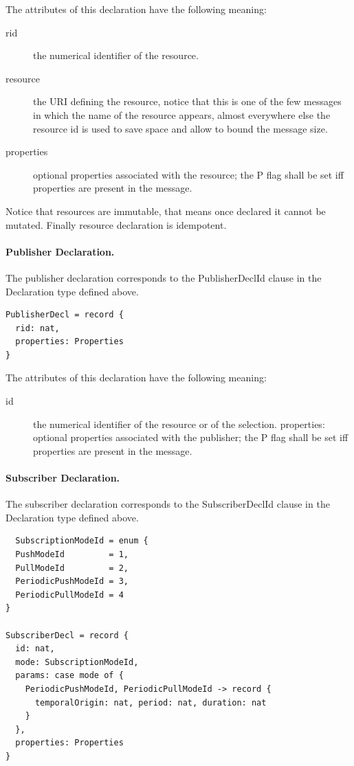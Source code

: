 \documentclass[a4paper,oneside,article]{memoir}
\begin{document}
The attributes of this declaration have the following meaning:
\begin{description}
\item[rid] the numerical identifier of the resource.
\item[resource] the URI defining the resource, notice that this is one of the few messages in which
  the name of the resource appears, almost everywhere else the resource id is used to save space and
  allow to bound the message size.
\item[properties] optional properties associated with the resource; the P flag shall be set iff
  properties are present in the message.
\end{description}
Notice that resources are immutable, that means once declared it cannot be mutated. Finally resource
declaration is idempotent.

\paragraph{Publisher Declaration.} The publisher declaration corresponds to the PublisherDeclId
clause in the Declaration type defined above.
\begin{verbatim}
PublisherDecl = record {
  rid: nat,
  properties: Properties
}  
\end{verbatim}

The attributes of this declaration have the following meaning:
\begin{description}
\item[id] the numerical identifier of the resource or of the selection.  properties: optional
  properties associated with the publisher; the P flag shall be set iff properties are present in
  the message.
\end{description}

\paragraph{Subscriber Declaration.} The subscriber declaration corresponds to the SubscriberDeclId
clause in the Declaration type defined above.
\begin{verbatim}
  SubscriptionModeId = enum {
  PushModeId         = 1,
  PullModeId         = 2,
  PeriodicPushModeId = 3,
  PeriodicPullModeId = 4
}

SubscriberDecl = record {
  id: nat,
  mode: SubscriptionModeId,
  params: case mode of {
    PeriodicPushModeId, PeriodicPullModeId -> record {
      temporalOrigin: nat, period: nat, duration: nat
    }
  },
  properties: Properties
}
\end{verbatim}
\end{document}
